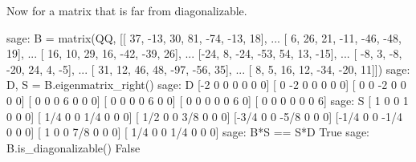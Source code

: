 %
Now for a matrix that is far from diagonalizable.
%
\begin{sageexample}
sage: B = matrix(QQ, [[ 37, -13,  30,  81, -74, -13,  18],
...                   [  6,  26,  21, -11, -46, -48,  19],
...                   [ 16,  10,  29,  16, -42, -39,  26],
...                   [-24,   8, -24, -53,  54,  13, -15],
...                   [ -8,   3,  -8, -20,  24,   4,  -5],
...                   [ 31,  12,  46,  48, -97, -56,  35],
...                   [  8,   5,  16,  12, -34, -20,  11]])
sage: D, S = B.eigenmatrix_right()
sage: D
[-2  0  0  0  0  0  0]
[ 0 -2  0  0  0  0  0]
[ 0  0 -2  0  0  0  0]
[ 0  0  0  6  0  0  0]
[ 0  0  0  0  6  0  0]
[ 0  0  0  0  0  6  0]
[ 0  0  0  0  0  0  6]
sage: S
[   1    0    0    1    0    0    0]
[ 1/4    0    0  1/4    0    0    0]
[ 1/2    0    0  3/8    0    0    0]
[-3/4    0    0 -5/8    0    0    0]
[-1/4    0    0 -1/4    0    0    0]
[   1    0    0  7/8    0    0    0]
[ 1/4    0    0  1/4    0    0    0]
sage: B*S == S*D
True
sage: B.is_diagonalizable()
False
\end{sageexample}
%
\begin{sageverbatim}
\end{sageverbatim}
%

